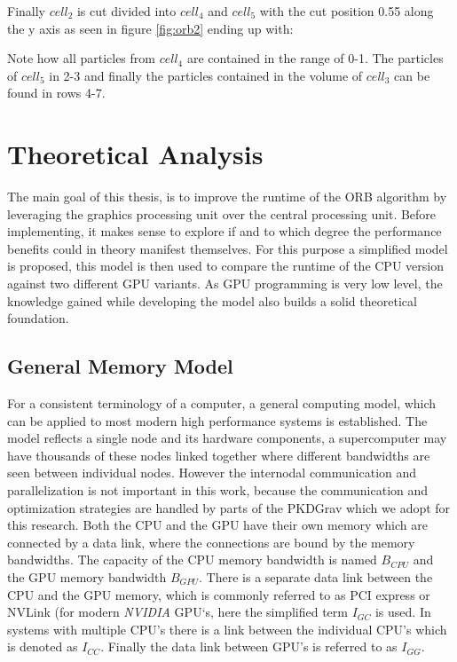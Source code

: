 \documentclass[]{article}
\begin{document}
Finally $cell_2$ is cut divided into $cell_4$ and $cell_5$ with the cut position 0.55 along the y axis as seen in figure \ref{fig:orb2} ending up with:

\begin{figure}[H]
	\begin{center}
	\end{center}
\end{figure}

Note how all particles from $cell_4$ are contained in the range of 0-1. The particles of $cell_5$ in 2-3 and finally the particles contained in the volume of $cell_3$ can be found in rows 4-7.


\newpage
\section{Theoretical Analysis}

The main goal of this thesis, is to improve the runtime of the ORB algorithm by leveraging the graphics processing unit over the central processing unit. Before implementing, it makes sense to explore if and to which degree the performance benefits could in theory manifest themselves. For this purpose a simplified model is proposed, this model is then used to compare the runtime of the CPU version against two different GPU variants. As GPU programming is very low level, the knowledge gained while developing the model also builds a solid theoretical foundation.

\subsection{General Memory Model}\label{sec:gmm}

For a consistent terminology of a computer, a general computing model, which can be applied to most modern high performance systems is established. The model reflects a single node and its hardware components, a supercomputer may have thousands of these nodes linked together where different bandwidths are seen between individual nodes.
However the internodal communication and parallelization is not important in this work, because the communication and optimization strategies are handled by parts of the PKDGrav which we adopt for this research.
Both the CPU and the GPU have their own memory which are connected by a data link, where the connections are bound by the memory bandwidths. The capacity of the CPU memory bandwidth is named $B_{CPU}$ and the GPU memory bandwidth $B_{GPU}$. There is a separate data link between the CPU and the GPU memory, which is commonly referred to as PCI express or NVLink (for modern \textit{NVIDIA} GPU`s, here the simplified term $I_{GC}$ is used. In systems with multiple CPU's there is a link between the individual CPU's which is denoted as $I_{CC}$. Finally the data link between GPU's is referred to as $I_{GG}$.
\end{document}

